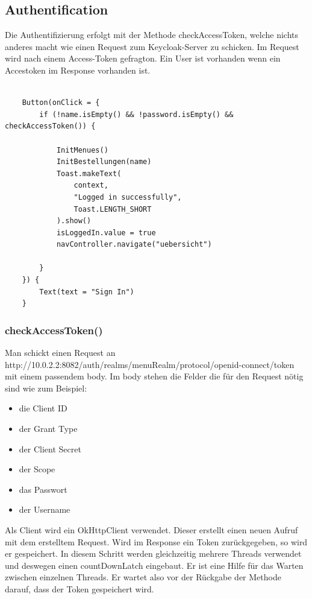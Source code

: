 \subsection{Authentification}
Die Authentifizierung erfolgt mit der Methode checkAccessToken, welche nichts anderes macht wie einen Request zum Keycloak-Server zu schicken.
Im Request wird nach einem Access-Token gefragton.
Ein User  ist vorhanden wenn ein Accestoken im Response vorhanden ist.

\begin{lstlisting}

    Button(onClick = {
        if (!name.isEmpty() && !password.isEmpty() && checkAccessToken()) {

            InitMenues()
            InitBestellungen(name)
            Toast.makeText(
                context,
                "Logged in successfully",
                Toast.LENGTH_SHORT
            ).show()
            isLoggedIn.value = true
            navController.navigate("uebersicht")

        }
    }) {
        Text(text = "Sign In")
    }

\end{lstlisting}




\subsubsection{checkAccessToken()}

Man schickt einen Request an http://10.0.2.2:8082/auth/realms/menuRealm/protocol/openid-connect/token mit einem passendem body.
Im body stehen die Felder die für den Request nötig sind wie zum Beispiel:
\begin{itemize}
    \item die Client ID
    \item der Grant Type 
    \item der Client Secret
    \item der Scope
    \item das Passwort
    \item der Username
\end{itemize}

Als Client wird ein OkHttpClient verwendet. Dieser erstellt einen neuen Aufruf mit dem erstelltem Request. 
Wird im Response ein Token zurückgegeben, so wird er gespeichert. In diesem Schritt werden gleichzeitig mehrere Threads verwendet und deswegen
einen countDownLatch eingebaut. Er ist eine Hilfe für das Warten zwischen einzelnen Threads.
Er wartet also vor der Rückgabe der Methode darauf, dass der Token gespeichert wird. 


